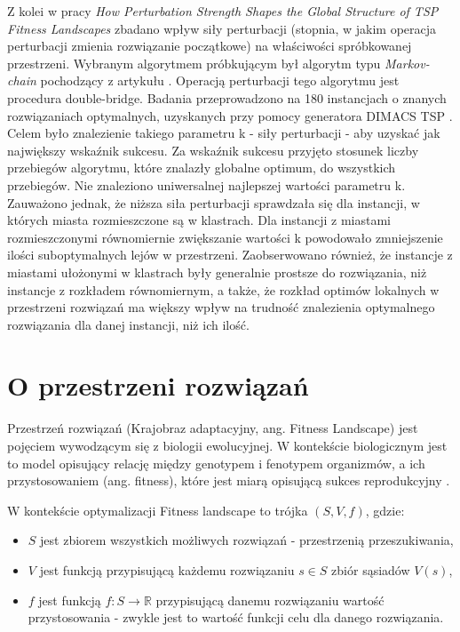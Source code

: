 Z kolei w pracy \textit{How Perturbation Strength Shapes the Global Structure of TSP Fitness Landscapes} \cite{DBLP:conf/evoW/McMenemyVO18} zbadano wpływ siły perturbacji (stopnia, w jakim operacja perturbacji zmienia rozwiązanie początkowe)
na właściwości spróbkowanej przestrzeni. Wybranym algorytmem próbkującym był algorytm typu \textit{Markov-chain} pochodzący z artykułu \cite{DBLP:journals/heuristics/OchoaV18}.
Operacją perturbacji tego algorytmu jest procedura double-bridge. Badania przeprowadzono na 180 instancjach o znanych rozwiązaniach optymalnych,
uzyskanych przy pomocy generatora DIMACS TSP . Celem było znalezienie takiego parametru k - siły perturbacji - aby uzyskać jak największy wskaźnik sukcesu.
Za wskaźnik sukcesu przyjęto stosunek liczby przebiegów algorytmu, które znalazły globalne optimum, do wszystkich przebiegów.
Nie znaleziono uniwersalnej najlepszej wartości parametru k. Zauważono jednak, że niższa siła perturbacji sprawdzała się dla instancji,
w których miasta rozmieszczone są w klastrach. Dla instancji z miastami rozmieszczonymi równomiernie zwiększanie wartości k powodowało
zmniejszenie ilości suboptymalnych lejów w przestrzeni.
Zaobserwowano również, że instancje z miastami ułożonymi w klastrach były generalnie prostsze do rozwiązania, niż instancje z rozkładem równomiernym,
a także, że rozkład optimów lokalnych w przestrzeni rozwiązań ma większy wpływ na trudność znalezienia optymalnego rozwiązania dla
danej instancji, niż ich ilość.

\section{O przestrzeni rozwiązań}
Przestrzeń rozwiązań (Krajobraz adaptacyjny, ang. Fitness Landscape) jest pojęciem wywodzącym się z biologii ewolucyjnej.
W kontekście biologicznym jest to model opisujący relację między genotypem i fenotypem organizmów, a ich przystosowaniem (ang. fitness),
które jest miarą opisującą sukces reprodukcyjny \cite{FRAGATA201969}.

W kontekście optymalizacji Fitness landscape to trójka $(S, V, f)$, gdzie:
\begin{itemize}
      \item $S$ jest zbiorem wszystkich możliwych rozwiązań - przestrzenią przeszukiwania,
      \item $V$ jest funkcją przypisującą każdemu rozwiązaniu $s\in{S}$ zbiór sąsiadów $V(s)$,
      \item $f$ jest funkcją $f:S \rightarrow \mathbb{R}$ przypisującą danemu rozwiązaniu wartość przystosowania
            - zwykle jest to wartość funkcji celu dla danego rozwiązania.
\end{itemize}

